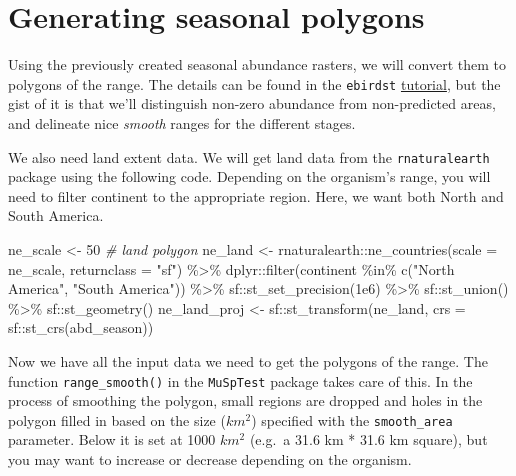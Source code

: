 \documentclass[
]{book}
\newenvironment{Shaded}{\begin{snugshade}}{\end{snugshade}}
\newcommand{\AttributeTok}[1]{\textcolor[rgb]{0.77,0.63,0.00}{#1}}
\newcommand{\CommentTok}[1]{\textcolor[rgb]{0.56,0.35,0.01}{\textit{#1}}}
\newcommand{\DecValTok}[1]{\textcolor[rgb]{0.00,0.00,0.81}{#1}}
\newcommand{\FloatTok}[1]{\textcolor[rgb]{0.00,0.00,0.81}{#1}}
\newcommand{\FunctionTok}[1]{\textcolor[rgb]{0.00,0.00,0.00}{#1}}
\newcommand{\NormalTok}[1]{#1}
\newcommand{\OtherTok}[1]{\textcolor[rgb]{0.56,0.35,0.01}{#1}}
\newcommand{\SpecialCharTok}[1]{\textcolor[rgb]{0.00,0.00,0.00}{#1}}
\newcommand{\StringTok}[1]{\textcolor[rgb]{0.31,0.60,0.02}{#1}}
\begin{document}
\hypertarget{generating-seasonal-polygons}{%
\section{Generating seasonal polygons}\label{generating-seasonal-polygons}}

Using the previously created seasonal abundance rasters, we will convert them to polygons of the range. The details can be found in the \texttt{ebirdst} \href{https://cornelllabofornithology.github.io/ebirdst/articles/ebirdst-advanced-mapping.html}{tutorial}, but the gist of it is that we'll distinguish non-zero abundance from non-predicted areas, and delineate nice \emph{smooth} ranges for the different stages.

We also need land extent data. We will get land data from the \texttt{rnaturalearth} package using the following code. Depending on the organism's range, you will need to filter continent to the appropriate region. Here, we want both North and South America.

\begin{Shaded}
\begin{Highlighting}[]
\NormalTok{ne\_scale }\OtherTok{\textless{}{-}} \DecValTok{50}
\CommentTok{\# land polygon}
\NormalTok{ne\_land }\OtherTok{\textless{}{-}}\NormalTok{ rnaturalearth}\SpecialCharTok{::}\FunctionTok{ne\_countries}\NormalTok{(}\AttributeTok{scale =}\NormalTok{ ne\_scale, }\AttributeTok{returnclass =} \StringTok{"sf"}\NormalTok{) }\SpecialCharTok{\%\textgreater{}\%}
\NormalTok{  dplyr}\SpecialCharTok{::}\FunctionTok{filter}\NormalTok{(continent }\SpecialCharTok{\%in\%} \FunctionTok{c}\NormalTok{(}\StringTok{"North America"}\NormalTok{, }\StringTok{"South America"}\NormalTok{)) }\SpecialCharTok{\%\textgreater{}\%}
\NormalTok{  sf}\SpecialCharTok{::}\FunctionTok{st\_set\_precision}\NormalTok{(}\FloatTok{1e6}\NormalTok{) }\SpecialCharTok{\%\textgreater{}\%}
\NormalTok{  sf}\SpecialCharTok{::}\FunctionTok{st\_union}\NormalTok{() }\SpecialCharTok{\%\textgreater{}\%} 
\NormalTok{  sf}\SpecialCharTok{::}\FunctionTok{st\_geometry}\NormalTok{()}
\NormalTok{ne\_land\_proj }\OtherTok{\textless{}{-}}\NormalTok{ sf}\SpecialCharTok{::}\FunctionTok{st\_transform}\NormalTok{(ne\_land, }\AttributeTok{crs =}\NormalTok{ sf}\SpecialCharTok{::}\FunctionTok{st\_crs}\NormalTok{(abd\_season))}
\end{Highlighting}
\end{Shaded}

Now we have all the input data we need to get the polygons of the range. The function \texttt{range\_smooth()} in the \texttt{MuSpTest} package takes care of this. In the process of smoothing the polygon, small regions are dropped and holes in the polygon filled in based on the size (\(km^2\)) specified with the \texttt{smooth\_area} parameter. Below it is set at 1000 \(km^2\) (e.g.~a 31.6 km * 31.6 km square), but you may want to increase or decrease depending on the organism.
\end{document}

